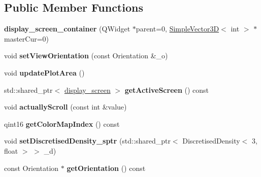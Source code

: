 \subsection*{Public Member Functions}
\begin{DoxyCompactItemize}
\item 
\mbox{\label{classdisplay__screen__container_aab2bf99421c31cb1665e9c22db1f647f}} 
{\bfseries display\+\_\+screen\+\_\+container} (Q\+Widget $\ast$parent=0, \mbox{\hyperlink{classViewer_1_1SimpleVector3D}{Simple\+Vector3D}}$<$ int $>$ $\ast$master\+Cur=0)
\item 
\mbox{\label{classdisplay__screen__container_a80401ba88f8bb7948c92885bf63df199}} 
void {\bfseries set\+View\+Orientation} (const Orientation \&\+\_\+o)
\item 
\mbox{\label{classdisplay__screen__container_a9e7e3ea8326eb4d608bdcbffbc27fe4f}} 
void {\bfseries update\+Plot\+Area} ()
\item 
\mbox{\label{classdisplay__screen__container_a8782d999fcd57ef6abd3b9bc0439b17e}} 
std\+::shared\+\_\+ptr$<$ \mbox{\hyperlink{classdisplay__screen}{display\+\_\+screen}} $>$ {\bfseries get\+Active\+Screen} () const
\item 
\mbox{\label{classdisplay__screen__container_a76b640770a87c25b9c90ab31d1416bf7}} 
void {\bfseries actually\+Scroll} (const int \&value)
\item 
\mbox{\label{classdisplay__screen__container_a50ff4dd02e4d9d6b2e2485755800e6a2}} 
qint16 {\bfseries get\+Color\+Map\+Index} () const
\item 
\mbox{\label{classdisplay__screen__container_a2a74ef695fda8ea90ea71e11335bb7eb}} 
void {\bfseries set\+Discretised\+Density\+\_\+sptr} (std\+::shared\+\_\+ptr$<$ Discretised\+Density$<$ 3, float $>$ $>$ \+\_\+d)
\item 
\mbox{\label{classdisplay__screen__container_adbad3631ce9b6b6bf4c6cb2f611b394b}} 
const Orientation $\ast$ {\bfseries get\+Orientation} () const

\end{DoxyCompactItemize}
